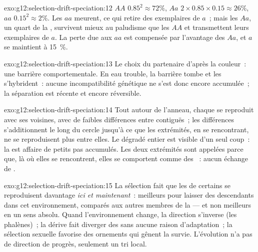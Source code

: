 \begin{solution}{exo:g12:selection-drift-speciation:12}
$AA$ $0.85^2 \approx 72\%$, $Aa$ $2 \times 0.85 \times 0.15 \approx
26\%$, $aa$ $0.15^2 \approx 2\%$. Les $aa$ meurent, ce qui retire des
exemplaires de $a$~; mais les $Aa$, un quart de la ,
survivent mieux au paludisme que les $AA$ et transmettent leurs
exemplaires de $a$. La perte due aux $aa$ est compensée par l'avantage
des $Aa$, et $a$ se maintient à 15~\%.
\end{solution}

\begin{solution}{exo:g12:selection-drift-speciation:13}
Le choix du partenaire d'après la couleur~: une barrière
comportementale. En eau trouble, la barrière tombe et les 
s'hybrident~: aucune incompatibilité génétique ne s'est donc encore
accumulée~; la séparation est récente et encore réversible.
\end{solution}

\begin{solution}{exo:g12:selection-drift-speciation:14}
Tout autour de l'anneau, chaque  se reproduit avec ses
voisines, avec de faibles différences entre  contiguës~; les
différences s'additionnent le long du cercle jusqu'à ce que les
extrémités, en se rencontrant, ne se reproduisent plus entre elles. Le
dégradé entier est visible d'un seul coup~: la  est affaire
de petits pas accumulés. Les deux extrémités sont appelées 
parce que, là où elles se rencontrent, elles se comportent comme des
~: aucun échange de .
\end{solution}

\begin{solution}{exo:g12:selection-drift-speciation:15}
La sélection fait que les  de certains  se reproduisent
davantage \emph{ici et maintenant}~: meilleurs pour laisser des
descendants dans cet environnement, comparés aux autres membres de la
 --- et non meilleurs en un sens absolu. Quand
l'environnement change, la direction s'inverse (les phalènes)~; la
dérive fait diverger des  sans aucune raison d'adaptation~;
la sélection sexuelle favorise des ornements qui gênent la survie.
L'évolution n'a pas de direction de progrès, seulement un tri local.
\end{solution}

